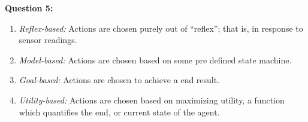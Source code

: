 \textbf{Question 5:}


\begin{enumerate}[i]

\item \emph{Reflex-based:} Actions are chosen purely out of ``reflex''; that is, in response to sensor readings.
\item\emph{Model-based:} Actions are chosen based on some pre defined state machine.
\item\emph{Goal-based:} Actions are chosen to achieve a end result.
\item\emph{Utility-based:} Actions are chosen based on maximizing utility, a function which quantifies the end, or current state of the agent. 

\end{enumerate}

